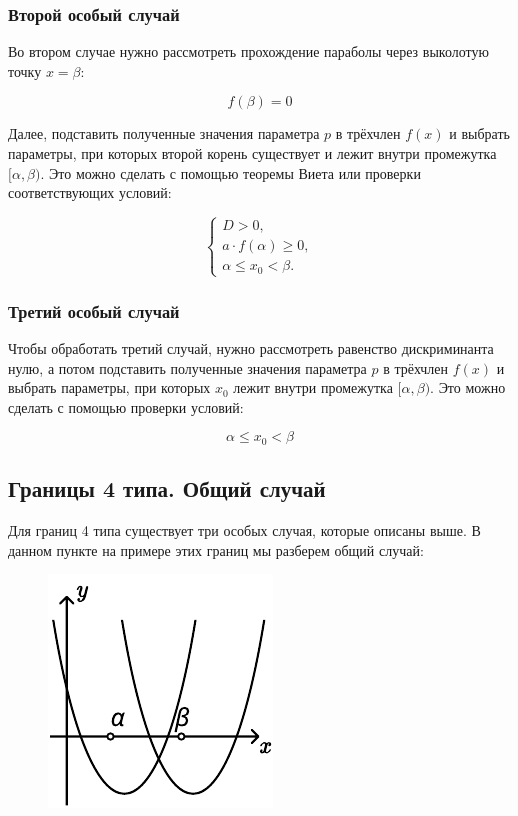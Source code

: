 \subsubsection {Второй особый случай}
Во втором случае нужно рассмотреть прохождение параболы через выколотую точку $x = \beta$:

\begin {equation*}
    f(\beta) = 0
\end {equation*}

Далее, подставить полученные значения параметра $p$ в трёхчлен $f(x)$ и выбрать параметры, при
которых второй корень существует и лежит внутри промежутка $[\alpha, \beta)$. Это можно
сделать с помощью теоремы Виета или проверки соответствующих условий:

\begin {equation*}
    \begin {cases}
        D > 0, 
        \\
        a \cdot f(\alpha) \geqslant 0,
        \\
        \alpha \leqslant x_0 < \beta.
    \end {cases}
\end {equation*}

\subsubsection {Третий особый случай}

Чтобы обработать третий случай, нужно рассмотреть равенство дискриминанта нулю, а потом
подставить полученные значения параметра $p$ в трёхчлен $f(x)$ и выбрать параметры, при которых
$x_0$ лежит внутри промежутка $[\alpha, \beta)$. Это можно сделать с помощью проверки условий:
    
\begin {equation*}
    \alpha \leqslant x_0 < \beta
\end {equation*}    

\subsection {Границы 4 типа. Общий случай}
 
Для границ 4 типа существует три особых случая, которые описаны выше. В данном пункте на примере 
этих границ мы разберем общий случай: 

\begin {figure} [h]
    \begin {minipage} [t] {\linewidth}
        \centering
        \includegraphics [width=0.3\linewidth] {image/image_05.pdf}
    \end {minipage}
\end {figure}


